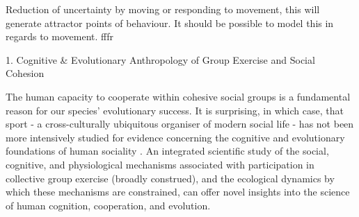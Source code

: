 \documentclass[12pt]{report}
\begin{document}
Reduction of uncertainty by moving or responding to movement, this will generate attractor points of behaviour. It should be possible to model this in regards to movement.  fffr


















































1. Cognitive \& Evolutionary Anthropology of Group Exercise and Social Cohesion

The human capacity to cooperate within cohesive social groups is a fundamental reason for our species' evolutionary success.  It is surprising, in which case, that sport - a cross-culturally ubiquitous organiser of modern social life - has not been more intensively studied for evidence concerning the cognitive and evolutionary foundations of human sociality \citep{Blanchard1995,Downey2005a}.  An integrated scientific study of the social, cognitive, and physiological mechanisms associated with participation in collective group exercise (broadly construed), and the ecological dynamics by which these mechanisms are constrained, can offer novel insights into the science of human cognition, cooperation, and evolution.
\end{document}
